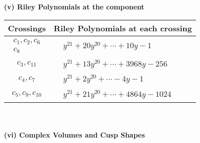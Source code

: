 \documentclass[1p]{elsarticle_modified}
\theoremstyle{definition}
\begin{document}
\newpage\renewcommand{\arraystretch}{1}
\flushleft \textbf{(v) Riley Polynomials at the component}\newline \\
\begin{tabular}{m{50pt}|m{274pt}}
Crossings & \hspace{64pt}Riley Polynomials at each crossing \\
\hline $$\begin{aligned}c_{1},c_{2},c_{6}\\c_{8}\end{aligned}$$&$\begin{aligned}
&y^{21}+20 y^{20}+\cdots+10 y-1
\end{aligned}$\\
\hline $$\begin{aligned}c_{3},c_{11}\end{aligned}$$&$\begin{aligned}
&y^{21}+13 y^{20}+\cdots+3968 y-256
\end{aligned}$\\
\hline $$\begin{aligned}c_{4},c_{7}\end{aligned}$$&$\begin{aligned}
&y^{21}+2 y^{20}+\cdots-4 y-1
\end{aligned}$\\
\hline $$\begin{aligned}c_{5},c_{9},c_{10}\end{aligned}$$&$\begin{aligned}
&y^{21}+21 y^{20}+\cdots+4864 y-1024
\end{aligned}$\\
\hline
\end{tabular}\\~\\
\newpage\flushleft \textbf{(vi) Complex Volumes and Cusp Shapes}
\end{document}

